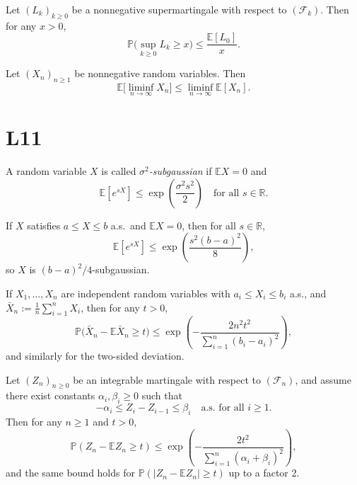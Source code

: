 \documentclass[answers,12pt,addpoints]{exam}
\begin{document}
\begin{theorem}
Let $(L_k)_{k\ge 0}$ be a nonnegative supermartingale with respect to $(\mathcal{F}_k)$. Then for any $x>0$,
\[
\mathbb{P}\Big(\sup_{k\ge 0} L_k \ge x\Big) \le \frac{\mathbb{E}[L_0]}{x}.
\]
\end{theorem}

\begin{theorem}
Let $(X_n)_{n\ge 1}$ be nonnegative random variables. Then
\[
\mathbb{E}\Big[\liminf_{n\to\infty} X_n\Big] \le \liminf_{n\to\infty} \mathbb{E}[X_n].
\]
\end{theorem}

\section{L11}

\begin{definition}
A random variable $X$ is called \emph{$\sigma^2$-subgaussian} if $\mathbb{E}X=0$ and
\[
\mathbb{E}[e^{sX}] \le \exp\left(\frac{\sigma^2 s^2}{2}\right)\quad \text{for all } s\in\mathbb{R}.
\]
\end{definition}

\begin{lemma}
If $X$ satisfies $a\le X\le b$ a.s.\ and $\mathbb{E}X=0$, then for all $s\in\mathbb{R}$,
\[
\mathbb{E}[e^{sX}] \le \exp\left(\frac{s^2(b-a)^2}{8}\right),
\]
so $X$ is $(b-a)^2/4$-subgaussian.

If $X_1,\dots,X_n$ are independent random variables with $a_i \le X_i \le b_i$ a.s., and $\bar X_n := \frac{1}{n}\sum_{i=1}^n X_i$, then for any $t>0$,
\[
\mathbb{P}\big(\bar X_n - \mathbb{E}\bar X_n \ge t\big) \le \exp\left(-\frac{2n^2 t^2}{\sum_{i=1}^n (b_i - a_i)^2}\right),
\]
and similarly for the two-sided deviation.
\end{lemma}

\begin{theorem}
Let $(Z_n)_{n\ge 0}$ be an integrable martingale with respect to $(\mathcal{F}_n)$, and assume there exist constants $\alpha_i,\beta_i\ge 0$ such that
\[
-\alpha_i \le Z_i - Z_{i-1} \le \beta_i \quad \text{a.s. for all } i\ge 1.
\]
Then for any $n\ge 1$ and $t>0$,
\[
\mathbb{P}(Z_n - \mathbb{E}Z_n \ge t) \le \exp\left(-\frac{2t^2}{\sum_{i=1}^n (\alpha_i + \beta_i)^2}\right),
\]
and the same bound holds for $\mathbb{P}(|Z_n - \mathbb{E}Z_n|\ge t)$ up to a factor 2.
\end{theorem}
\end{document}
